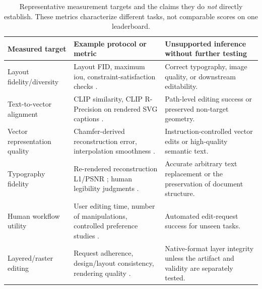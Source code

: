 \begin{table}[t]
\centering
\caption{Representative measurement targets and the claims they do \emph{not} directly establish.
These metrics characterize different tasks, not comparable scores on one leaderboard.}
\label{tab:metrics}
\small
\begin{tabularx}{\textwidth}{@{}p{}XX@{}}
\toprule
\textbf{Measured target} & \textbf{Example protocol or metric} & \textbf{Unsupported inference without further testing}\\
\midrule
Layout fidelity/diversity & Layout FID, maximum \ac{iou}, constraint-satisfaction checks \citep{layoutdm2023}. & Correct typography, image quality, or downstream editability.\\
Text-to-vector alignment & CLIP similarity, CLIP R-Precision on rendered SVG captions \citep{vectorfusion2023}. & Path-level editing success or preserved non-target geometry.\\
Vector representation quality & Chamfer-derived reconstruction error, interpolation smoothness \citep{deepsvg2020}. & Instruction-controlled vector edits or high-quality semantic text.\\
Typography fidelity & Re-rendered reconstruction L1/PSNR \citep{derendering2021}; human legibility judgments \citep{wordasimage2023}. & Accurate arbitrary text replacement or the preservation of document structure.\\
Human workflow utility & User editing time, number of manipulations, controlled preference studies \citep{vinci2021}. & Automated edit-request success for unseen tasks.\\
Layered/raster editing & Request adherence, design/layout consistency, rendering quality \citep{mildedit2026,posteromni2026}. & Native-format layer integrity unless the artifact and validity are separately tested.\\
\bottomrule
\end{tabularx}
\end{table}
